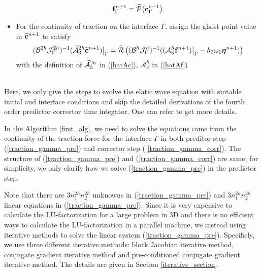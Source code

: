 \begin{breakablealgorithm}
\begin{itemize}
{			\begin{equation*}
			{\bf f}^{n+1}_{\Gamma} = \widetilde{\mathcal{P}}\big({\bf c}^{n+1}_{\Gamma}\big)
			\end{equation*}
		}
		\item{For the continuity of traction on the interface $\Gamma$, assign the ghost point value in $\widetilde{\bf c}^{n+1}$ to satisfy
			\begin{equation}\label{traction_gamma_corr}
			(\mathcal{B}^{2h}{\mathcal J}_{\Gamma}^{2h})^{-1}(\wt{\mathcal{A}}_3^{2h}\wt{\bf c}^{n+1})\big|_\Gamma
			= \wt{\mathcal{R}}\left((\mathcal{B}^{h}{\mathcal J}^h_{\Gamma})^{-1}((\mathcal{A}_3^h{\bf f}^{n+1})\big|_\Gamma-h_3\omega_1{\bm \eta}^{n+1})\right)
			\end{equation}
			with the definition of $\widetilde{\mathcal{A}}_3^{2h}$ in (\ref{hatAc}), $\mathcal{A}_3^h$ in (\ref{hatAf})
		}
	\end{itemize}
\end{breakablealgorithm}
~\\
Here, we only give the steps to evolve the elatic wave equation with suitable initial and interface conditions and skip the detailed derivations of the fourth order predictor corrector time integator. One can refer \cite{wang2018fourth} to get more details.

In the Algorithm \ref{first_alg}, we need to solve the equations come from the continuity of the traction force for the interface $\Gamma$ in both preditor step (\ref{traction_gamma_pre}) and corrector step (
\ref{traction_gamma_corr}). The structure of (\ref{traction_gamma_pre}) and (\ref{traction_gamma_corr}) are same, for simplicity, we only clarify how we solve (\ref{traction_gamma_pre}) in the predictor step.

Note that there are $3n_1^{2h}n_2^{2h}$ unknowns in (\ref{traction_gamma_pre}) and $3n_1^{2h}n_2^{2h}$ linear equations in (\ref{traction_gamma_pre}). Since it is very expensive to calculate the LU-factorization for a large problem in $3$D and there is no efficient ways to calculate the LU-factorization in a parallel machine, we instead using iterative methods to solve the linear system (\ref{traction_gamma_pre}). Specificly, we use three different iterative methods: block Jacobian iterative method, conjugate gradient iterative method and pre-conditioned conjugate gradient iterative method. The details are given in Section \ref{iterative_section}.
